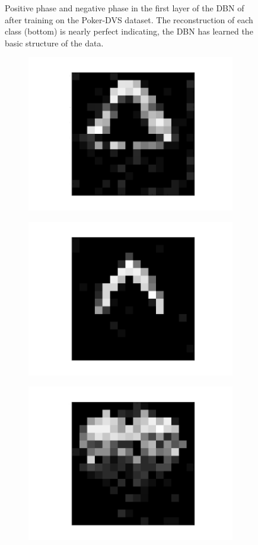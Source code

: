 \begin{figure}[h!]
\begin{subfigure}{.25\textwidth}
  		\label{fig:sub1}
	\end{subfigure}%
	\caption[Positive phase and negative phase in the first layer of the DBN of after training on the Poker-DVS dataset.]{Positive phase and negative phase in the first layer of the DBN of after training on the Poker-DVS dataset. The reconstruction of each class (bottom) is nearly perfect indicating, the DBN has learned the basic structure of the data.}
	\label{fig:pokerrecon}
\end{figure}



\begin{figure}[h!]
	\centering
	\begin{subfigure}{.25\textwidth}
  		\centering
  		\includegraphics[width=.6\linewidth]{imgs/poker/compl11.png}
  		\label{fig:sub1}
	\end{subfigure}%
	\begin{subfigure}{.25\textwidth}
  		\centering
  		\includegraphics[width=.6\linewidth]{imgs/poker/compl21.png}
  		\label{fig:sub1}
	\end{subfigure}%
	\begin{subfigure}{.25\textwidth}
  		\centering
  		\includegraphics[width=.6\linewidth]{imgs/poker/compl31.png}

\end{subfigure}
\end{figure}
